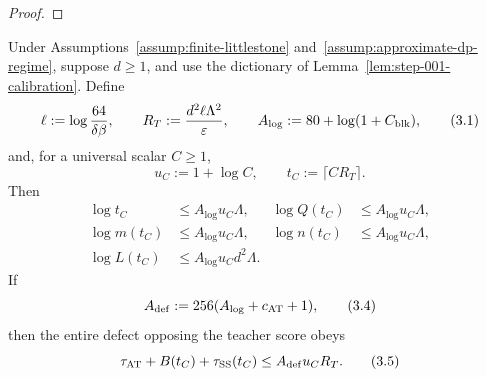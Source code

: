 \begin{proof}
\end{proof}

\begin{lemma}\label{lem:step-001-envelope}
Under Assumptions~\ref{assump:finite-littlestone}
and~\ref{assump:approximate-dp-regime}, suppose \(d\ge1\), and use the
dictionary of Lemma~\ref{lem:step-001-calibration}. Define
\[
\ell:=\log\frac{64}{\delta\beta},
\qquad
R_T:=\frac{d^2\ell\Lambda^2}{\varepsilon},
\qquad
A_{\log}:=80+\log(1+C_{\rm blk}),
\tag{3.1}
\]
and, for a universal scalar \(C\ge1\),
\[
u_C:=1+\log C,
\qquad t_C:=\lceil CR_T\rceil.
\tag{3.2}
\]
Then
\[
\begin{aligned}
\log t_C&\le A_{\log}u_C\Lambda,&
\log Q(t_C)&\le A_{\log}u_C\Lambda,\\
\log m(t_C)&\le A_{\log}u_C\Lambda,&
\log n(t_C)&\le A_{\log}u_C\Lambda,\\
\log L(t_C)&\le A_{\log}u_Cd^2\Lambda.
\end{aligned}
\tag{3.3}
\]
If
\[
A_{\rm def}:=256(A_{\log}+c_{\rm AT}+1),
\tag{3.4}
\]
then the entire defect opposing the teacher score obeys
\[
\tau_{\rm AT}+B(t_C)+\tau_{\rm SS}(t_C)
\le A_{\rm def}u_CR_T.
\tag{3.5}
\]


\end{lemma}

